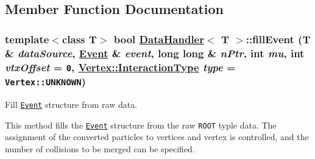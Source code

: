 \subsection{Member Function Documentation}
\hypertarget{structDataHandler_be7affae244cf17f9ef93b2d1216ce6d}{
\subsubsection[fillEvent]{\setlength{\rightskip}{0pt plus 5cm}template$<$class T$>$ bool \hyperlink{structDataHandler}{Data\-Handler}$<$ T $>$::fill\-Event (T \& {\em data\-Source}, \hyperlink{classEvent}{Event} \& {\em event}, long long \& {\em n\-Ptr}, int {\em mu}, int {\em vtx\-Offset} = {\tt 0}, \hyperlink{classVertex_0d80a5c5ed3bd9be72a325aa448eca25}{Vertex::Interaction\-Type} {\em type} = {\tt Vertex::UNKNOWN})}}
\label{structDataHandler_be7affae244cf17f9ef93b2d1216ce6d}


Fill {\tt \hyperlink{classEvent}{Event}} structure from raw data. 

This method fills the {\tt \hyperlink{classEvent}{Event}} structure from the raw {\tt ROOT} typle data. The assignment of the converted particles to vertices and vertex is controlled, and the number of collisions to be merged can be specified.

